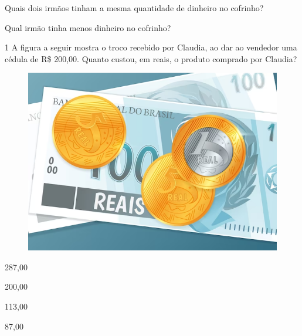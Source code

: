 \begin{escolha}
\item Quais dois irmãos tinham a mesma quantidade de dinheiro no cofrinho?


\item Qual irmão tinha menos dinheiro no cofrinho?

\end{escolha}


\num{1} A figura a seguir mostra o troco recebido por Claudia, ao dar ao vendedor
uma cédula de R\$ 200,00. Quanto custou, em reais, o produto comprado por Claudia?


\begin{figure}[htpb!]
\centering
\includegraphics[width=.5\textwidth]{./media/image78.png}
\end{figure}

\begin{minipage}{.5\textwidth}
\begin{escolha}
\item 287,00

\item 200,00

\item 113,00

\item 87,00
\end{escolha}
\end{minipage}

